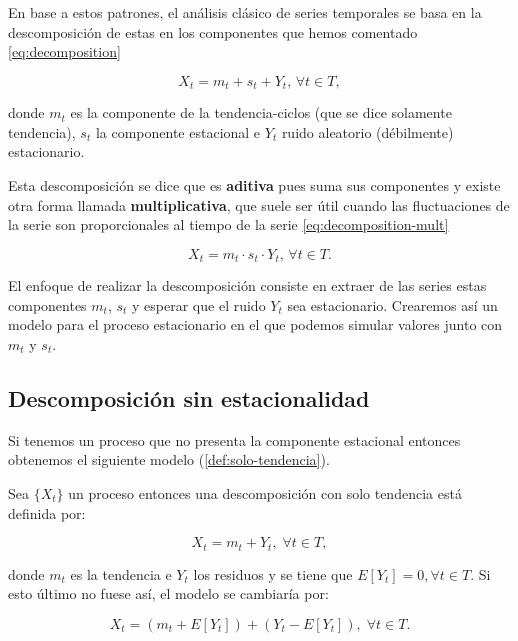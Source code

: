 En base a estos patrones, el análisis clásico de series temporales se basa en la descomposición de estas en los componentes que hemos comentado \eqref{eq:decomposition}

\begin{equation}
  X_t = m_t + s_t + Y_t, \, \forall t \in T,
  \label{eq:decomposition}
\end{equation}

donde $m_t$ es la componente de la tendencia-ciclos (que se dice solamente tendencia), $s_t$ la componente estacional e $Y_t$ ruido aleatorio (débilmente) estacionario.

Esta descomposición se dice que es \textbf{aditiva} pues suma sus componentes y existe otra forma llamada \textbf{multiplicativa}, que suele ser útil cuando las fluctuaciones de la serie son proporcionales al tiempo de la serie \eqref{eq:decomposition-mult}

\begin{equation}
  X_t = m_t \cdot s_t \cdot Y_t, \, \forall t \in T.
  \label{eq:decomposition-mult}
\end{equation}

El enfoque de realizar la descomposición consiste en extraer de las series estas componentes $m_t$, $s_t$ y esperar que el ruido $Y_t$ sea estacionario. Crearemos así un modelo para el proceso estacionario en el que podemos simular valores junto con $m_t$ y $s_t$.

\subsection{Descomposición sin estacionalidad}

Si tenemos un proceso que no presenta la componente estacional entonces obtenemos el siguiente modelo (\autoref{def:solo-tendencia}).

\begin{definicion}
  Sea $\{X_t\}$ un proceso entonces una descomposición con solo tendencia está definida por:

  $$ X_t = m_t + Y_t, \; \forall t \in T,$$

  donde $m_t$ es la tendencia e $Y_t$ los residuos y se tiene que $E[Y_t] = 0, \forall t \in T$. Si esto último no fuese así, el modelo se cambiaría por:

  $$ X_t = (m_t + E[Y_t]) + (Y_t - E[Y_t]), \; \forall t \in T.$$
  \label{def:solo-tendencia}
\end{definicion}

